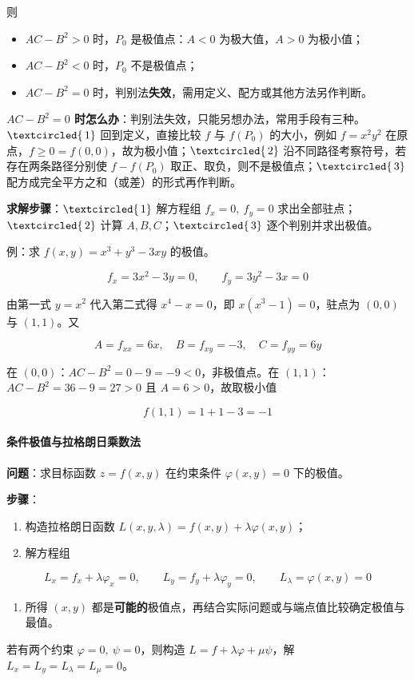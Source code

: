 \documentclass[11pt,openany,UTF8]{ctexbook}
\newcommand{\circled}[1]{\textcircled{\scriptsize\,#1}}
\begin{document}
则

\begin{itemize}
\item $AC-B^{2}>0$ 时，$P_0$ 是极值点：$A<0$ 为极大值，$A>0$ 为极小值；
\item $AC-B^{2}<0$ 时，$P_0$ 不是极值点；
\item $AC-B^{2}=0$ 时，判别法\textbf{失效}，需用定义、配方或其他方法另作判断。
\end{itemize}
\textbf{$AC-B^{2}=0$ 时怎么办}：判别法失效，只能另想办法，常用手段有三种。$\circled{1}$ 回到定义，直接比较 $f$ 与 $f(P_0)$ 的大小，例如 $f=x^{2}y^{2}$ 在原点，$f\ge 0=f(0,0)$，故为极小值；$\circled{2}$ 沿不同路径考察符号，若存在两条路径分别使 $f-f(P_0)$ 取正、取负，则不是极值点；$\circled{3}$ 配方成完全平方之和（或差）的形式再作判断。

\textbf{求解步骤}：$\circled{1}$ 解方程组 $f_x=0,\ f_y=0$ 求出全部驻点；$\circled{2}$ 计算 $A,B,C$；$\circled{3}$ 逐个判别并求出极值。

例：求 $f(x,y)=x^{3}+y^{3}-3xy$ 的极值。

\[f_x=3x^{2}-3y=0,\qquad f_y=3y^{2}-3x=0\]

由第一式 $y=x^{2}$ 代入第二式得 $x^{4}-x=0$，即 $x(x^{3}-1)=0$，驻点为 $(0,0)$ 与 $(1,1)$。又

\[A=f_{xx}=6x,\quad B=f_{xy}=-3,\quad C=f_{yy}=6y\]

在 $(0,0)$：$AC-B^{2}=0-9=-9<0$，非极值点。在 $(1,1)$：$AC-B^{2}=36-9=27>0$ 且 $A=6>0$，故取极小值

\[f(1,1)=1+1-3=-1\]

\paragraph{条件极值与拉格朗日乘数法}\mbox{}{\par}

\textbf{问题}：求目标函数 $z=f(x,y)$ 在约束条件 $\varphi(x,y)=0$ 下的极值。

\textbf{步骤}：

\begin{enumerate}
\item 构造拉格朗日函数 $L(x,y,\lambda)=f(x,y)+\lambda\varphi(x,y)$；
\item 解方程组
\end{enumerate}
\[L_x=f_x+\lambda\varphi_x=0,\qquad L_y=f_y+\lambda\varphi_y=0,\qquad L_\lambda=\varphi(x,y)=0\]

\begin{enumerate}
\item 所得 $(x,y)$ 都是\textbf{可能的}极值点，再结合实际问题或与端点值比较确定极值与最值。
\end{enumerate}
若有两个约束 $\varphi=0,\ \psi=0$，则构造 $L=f+\lambda\varphi+\mu\psi$，解 $L_x=L_y=L_\lambda=L_\mu=0$。
\end{document}
